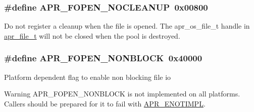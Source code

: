 \subsubsection[{\texorpdfstring{A\+P\+R\+\_\+\+F\+O\+P\+E\+N\+\_\+\+N\+O\+C\+L\+E\+A\+N\+UP}{APR_FOPEN_NOCLEANUP}}]{\setlength{\rightskip}{0pt plus 5cm}\#define A\+P\+R\+\_\+\+F\+O\+P\+E\+N\+\_\+\+N\+O\+C\+L\+E\+A\+N\+UP~0x00800}\hypertarget{group__apr__file__open__flags_ga3fc9b5a7791d9f462997cd29de67eb80}{}\label{group__apr__file__open__flags_ga3fc9b5a7791d9f462997cd29de67eb80}
Do not register a cleanup when the file is opened. The apr\+\_\+os\+\_\+file\+\_\+t handle in \hyperlink{structapr__file__t}{apr\+\_\+file\+\_\+t} will not be closed when the pool is destroyed. 
\subsubsection[{\texorpdfstring{A\+P\+R\+\_\+\+F\+O\+P\+E\+N\+\_\+\+N\+O\+N\+B\+L\+O\+CK}{APR_FOPEN_NONBLOCK}}]{\setlength{\rightskip}{0pt plus 5cm}\#define A\+P\+R\+\_\+\+F\+O\+P\+E\+N\+\_\+\+N\+O\+N\+B\+L\+O\+CK~0x40000}\hypertarget{group__apr__file__open__flags_ga31e4d14068147e43e1778bcf975dda62}{}\label{group__apr__file__open__flags_ga31e4d14068147e43e1778bcf975dda62}
Platform dependent flag to enable non blocking file io

\begin{DoxyWarning}{Warning}
A\+P\+R\+\_\+\+F\+O\+P\+E\+N\+\_\+\+N\+O\+N\+B\+L\+O\+CK is not implemented on all platforms. Callers should be prepared for it to fail with \hyperlink{group__APR__Error_ga939ddb834a30bc9a5a0a329b13000161}{A\+P\+R\+\_\+\+E\+N\+O\+T\+I\+M\+PL}. 
\end{DoxyWarning}
